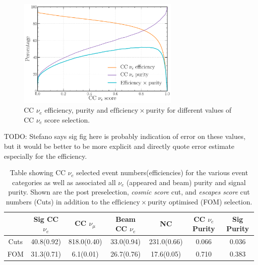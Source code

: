 \begin{figure} %
    \includegraphics[width=0.7\textwidth]{diagrams/6-cvn/chipsnet/final_nuel_eff_curves.pdf}
    \caption[CC $\nu_{e}$ efficiency, purity and $\mathrm{efficiency}\times\mathrm{purity}$.]
    {CC $\nu_{e}$ efficiency, purity and $\mathrm{efficiency}\times\mathrm{purity}$ for different
        values of CC $\nu_{e}$ score selection.}
    \label{fig:final_nuel_eff_curves}
\end{figure}

TODO: Stefano says sig fig here is probably indication of error on these values, but it would be
better to be more explicit and directly quote error estimate especially for the efficiency.

\begin{table}
    \begin{tabular}{ccccccc}
             & Sig CC $\nu_{e}$ & CC $\nu_{\mu}$ & Beam CC $\nu_{e}$ & NC          & CC $\nu_{e}$ Purity & Sig Purity \\
        \midrule
        Cuts & 40.8(0.92)       & 818.0(0.40)    & 33.0(0.94)        & 231.0(0.66) & 0.066               & 0.036      \\
        FOM  & 31.3(0.71)       & 6.1(0.01)      & 26.7(0.76)        & 17.6(0.05)  & 0.710               & 0.383      \\
    \end{tabular}
    \caption[Table showing CC $\nu_{e}$ selected event numbers, efficiencies and signal purity.]
    {Table showing CC $\nu_{e}$ selected event numbers(efficiencies) for the various event
        categories as well as associated all $\nu_{e}$ (appeared and beam) purity and signal
        purity. Shown are the post preselection, \emph{cosmic score} cut, and \emph{escapes score}
        cut numbers (Cuts) in addition to the $\mathrm{efficiency}\times\mathrm{purity}$ optimised
        (FOM) selection.}
    \label{tab:nuel_selection}
\end{table}

